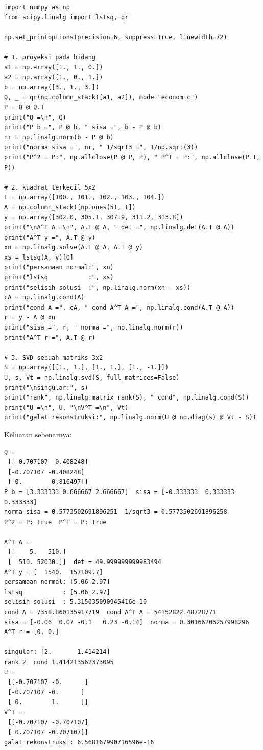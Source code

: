 \begin{lab}
\begin{verbatim}
import numpy as np
from scipy.linalg import lstsq, qr

np.set_printoptions(precision=6, suppress=True, linewidth=72)

# 1. proyeksi pada bidang
a1 = np.array([1., 1., 0.])
a2 = np.array([1., 0., 1.])
b = np.array([3., 1., 3.])
Q, _ = qr(np.column_stack([a1, a2]), mode="economic")
P = Q @ Q.T
print("Q =\n", Q)
print("P b =", P @ b, " sisa =", b - P @ b)
nr = np.linalg.norm(b - P @ b)
print("norma sisa =", nr, " 1/sqrt3 =", 1/np.sqrt(3))
print("P^2 = P:", np.allclose(P @ P, P), " P^T = P:", np.allclose(P.T, P))

# 2. kuadrat terkecil 5x2
t = np.array([100., 101., 102., 103., 104.])
A = np.column_stack([np.ones(5), t])
y = np.array([302.0, 305.1, 307.9, 311.2, 313.8])
print("\nA^T A =\n", A.T @ A, " det =", np.linalg.det(A.T @ A))
print("A^T y =", A.T @ y)
xn = np.linalg.solve(A.T @ A, A.T @ y)
xs = lstsq(A, y)[0]
print("persamaan normal:", xn)
print("lstsq           :", xs)
print("selisih solusi  :", np.linalg.norm(xn - xs))
cA = np.linalg.cond(A)
print("cond A =", cA, " cond A^T A =", np.linalg.cond(A.T @ A))
r = y - A @ xn
print("sisa =", r, " norma =", np.linalg.norm(r))
print("A^T r =", A.T @ r)

# 3. SVD sebuah matriks 3x2
S = np.array([[1., 1.], [1., 1.], [1., -1.]])
U, s, Vt = np.linalg.svd(S, full_matrices=False)
print("\nsingular:", s)
print("rank", np.linalg.matrix_rank(S), " cond", np.linalg.cond(S))
print("U =\n", U, "\nV^T =\n", Vt)
print("galat rekonstruksi:", np.linalg.norm(U @ np.diag(s) @ Vt - S))
\end{verbatim}
Keluaran sebenarnya:
\begin{verbatim}
Q =
 [[-0.707107  0.408248]
 [-0.707107 -0.408248]
 [-0.        0.816497]]
P b = [3.333333 0.666667 2.666667]  sisa = [-0.333333  0.333333  0.333333]
norma sisa = 0.5773502691896251  1/sqrt3 = 0.5773502691896258
P^2 = P: True  P^T = P: True

A^T A =
 [[    5.   510.]
 [  510. 52030.]]  det = 49.999999999983494
A^T y = [  1540.  157109.7]
persamaan normal: [5.06 2.97]
lstsq           : [5.06 2.97]
selisih solusi  : 5.315035090945416e-10
cond A = 7358.860135917719  cond A^T A = 54152822.48728771
sisa = [-0.06  0.07 -0.1   0.23 -0.14]  norma = 0.30166206257998296
A^T r = [0. 0.]

singular: [2.       1.414214]
rank 2  cond 1.414213562373095
U =
 [[-0.707107 -0.      ]
 [-0.707107 -0.      ]
 [-0.        1.      ]] 
V^T =
 [[-0.707107 -0.707107]
 [ 0.707107 -0.707107]]
galat rekonstruksi: 6.568167990716596e-16
\end{verbatim}
\end{lab}

